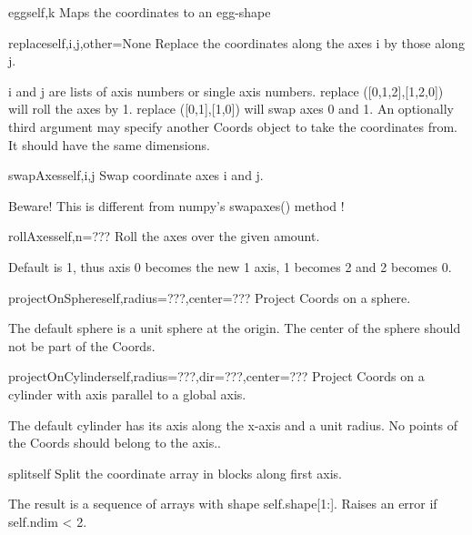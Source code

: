 \begin{funcdesc}{egg}{self,k}
Maps the coordinates to an egg-shape
\end{funcdesc}

\begin{funcdesc}{replace}{self,i,j,other=None}
Replace the coordinates along the axes i by those along j.

        i and j are lists of axis numbers or single axis numbers.
        replace ([0,1,2],[1,2,0]) will roll the axes by 1.
        replace ([0,1],[1,0]) will swap axes 0 and 1.
        An optionally third argument may specify another Coords object to take
        the coordinates from. It should have the same dimensions.
        
\end{funcdesc}

\begin{funcdesc}{swapAxes}{self,i,j}
Swap coordinate axes i and j.

        Beware! This is different from numpy's swapaxes() method !
        
\end{funcdesc}

\begin{funcdesc}{rollAxes}{self,n=???}
Roll the axes over the given amount.

        Default is 1, thus axis 0 becomes the new 1 axis, 1 becomes 2 and
        2 becomes 0.
        
\end{funcdesc}

\begin{funcdesc}{projectOnSphere}{self,radius=???,center=???}
Project Coords on a sphere.

        The default sphere is a unit sphere at the origin.
        The center of the sphere should not be part of the Coords.
        
\end{funcdesc}

\begin{funcdesc}{projectOnCylinder}{self,radius=???,dir=???,center=???}
Project Coords on a cylinder with axis parallel to a global axis.

        The default cylinder has its axis along the x-axis and a unit radius.
        No points of the Coords should belong to the axis..
        
\end{funcdesc}

\begin{funcdesc}{split}{self}
Split the coordinate array in blocks along first axis.

        The result is a sequence of arrays with shape self.shape[1:].
        Raises an error if self.ndim < 2.
        
\end{funcdesc}

